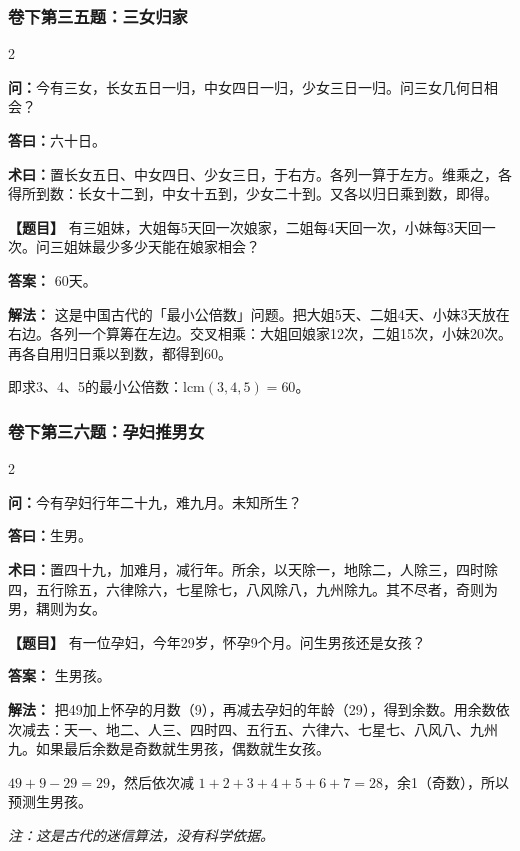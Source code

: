 \documentclass[11pt,a4paper]{article}
\begin{document}
\subsubsection*{卷下第三五题：三女归家}
\begin{paracol}{2}
\begin{problemclassical}
\textbf{问：}今有三女，长女五日一归，中女四日一归，少女三日一归。问三女几何日相会？

\textbf{答曰：}六十日。

\textbf{术曰：}置长女五日、中女四日、少女三日，于右方。各列一算于左方。维乘之，各得所到数：长女十二到，中女十五到，少女二十到。又各以归日乘到数，即得。
\end{problemclassical}
\switchcolumn
\begin{problemmodern}
\textbf{【题目】} 有三姐妹，大姐每5天回一次娘家，二姐每4天回一次，小妹每3天回一次。问三姐妹最少多少天能在娘家相会？

\textbf{答案：} 60天。

\textbf{解法：} 这是中国古代的「最小公倍数」问题。把大姐5天、二姐4天、小妹3天放在右边。各列一个算筹在左边。交叉相乘：大姐回娘家12次，二姐15次，小妹20次。再各自用归日乘以到数，都得到60。

即求3、4、5的最小公倍数：$\text{lcm}(3,4,5) = 60$。
\end{problemmodern}
\end{paracol}

\vspace{0.3cm}

\subsubsection*{卷下第三六题：孕妇推男女}
\begin{paracol}{2}
\begin{problemclassical}
\textbf{问：}今有孕妇行年二十九，难九月。未知所生？

\textbf{答曰：}生男。

\textbf{术曰：}置四十九，加难月，减行年。所余，以天除一，地除二，人除三，四时除四，五行除五，六律除六，七星除七，八风除八，九州除九。其不尽者，奇则为男，耦则为女。
\end{problemclassical}
\switchcolumn
\begin{problemmodern}
\textbf{【题目】} 有一位孕妇，今年29岁，怀孕9个月。问生男孩还是女孩？

\textbf{答案：} 生男孩。

\textbf{解法：} 把49加上怀孕的月数（9），再减去孕妇的年龄（29），得到余数。用余数依次减去：天一、地二、人三、四时四、五行五、六律六、七星七、八风八、九州九。如果最后余数是奇数就生男孩，偶数就生女孩。

$49 + 9 - 29 = 29$，然后依次减 $1+2+3+4+5+6+7 = 28$，余1（奇数），所以预测生男孩。

\textit{注：这是古代的迷信算法，没有科学依据。}
\end{problemmodern}
\end{paracol}
\end{document}

